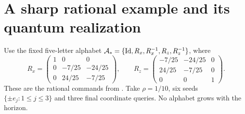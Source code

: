 \section{A sharp rational example and its quantum realization}
\label{sec:rational}
Use the fixed five-letter alphabet
$\mathcal A_* =\{\operatorname{Id},R_x,R_x^{-1},R_z,R_z^{-1}\}$, where
\begin{equation}\label{eq:gates}
 R_x=\begin{pmatrix}1&0&0\\0&-7/25&-24/25\\0&24/25&-7/25\end{pmatrix},
 \qquad
 R_z=\begin{pmatrix}-7/25&-24/25&0\\24/25&-7/25&0\\0&0&1\end{pmatrix}.
\end{equation}
These are the rational commands from \cite{GTF36}. Take $\rho=1/10$,
six seeds $\{\pm e_j:1\le j\le3\}$ and three final coordinate queries.
No alphabet grows with the horizon.

